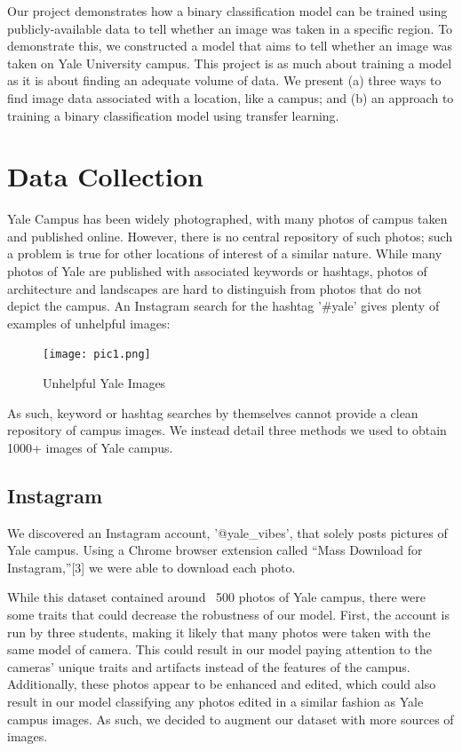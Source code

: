 \documentclass[letterpaper]{article} %
\begin{document}
Our project demonstrates how a binary classification model can be trained using publicly-available data to tell whether an image was taken in a specific region. To demonstrate this, we constructed a model that aims to tell whether an image was taken on Yale University campus. This project is as much about training a model as it is about finding an adequate volume of data. We present (a) three ways to find image data associated with a location, like a campus; and (b) an approach to training a binary classification model using transfer learning.

\section{Data Collection}
Yale Campus has been widely photographed, with many photos of campus taken and published online. However, there is no central repository of such photos; such a problem is true for other locations of interest of a similar nature. While many photos of Yale are published with associated keywords or hashtags, photos of architecture and landscapes are hard to distinguish from photos that do not depict the campus. An Instagram search for the hashtag '\#yale' gives plenty of examples of unhelpful images:

\begin{figure}
    \centering
    \texttt{[image: pic1.png]}
    \caption{Unhelpful Yale Images}
    \label{fig:enter-label}
\end{figure}

As such, keyword or hashtag searches by themselves cannot provide a clean repository of campus images. We instead detail three methods we used to obtain 1000+ images of Yale campus.


\subsection{Instagram}
We discovered an Instagram account, '@yale\_vibes', that solely posts pictures of Yale campus. Using a Chrome browser extension called “Mass Download for Instagram,”[3] we were able to download each photo.

While this dataset contained around ~500 photos of Yale campus, there were some traits that could decrease the robustness of our model. First, the account is run by three students, making it likely that many photos were taken with the same model of camera. This could result in our model paying attention to the cameras’ unique traits and artifacts instead of the features of the campus. Additionally, these photos appear to be enhanced and edited, which could also result in our model classifying any photos edited in a similar fashion as Yale campus images. As such, we decided to augment our dataset with more sources of images. 
\end{document}
